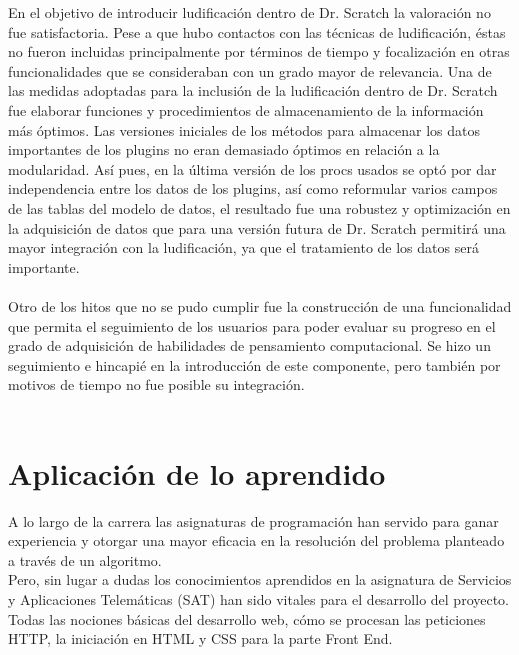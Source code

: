 \documentclass[a4paper, 12pt]{book}
\begin{document}
En el objetivo de introducir ludificación dentro de Dr. Scratch la 
valoración no fue satisfactoria. Pese a que hubo contactos con las 
técnicas de ludificación, éstas no fueron incluidas principalmente 
por términos de tiempo y focalización en otras funcionalidades que 
se consideraban con un grado mayor de relevancia. Una de las medidas
adoptadas para la inclusión de la ludificación dentro de Dr. Scratch
fue elaborar funciones y procedimientos de almacenamiento de la 
información más óptimos. Las versiones iniciales de los métodos para 
almacenar los datos importantes de los plugins no eran demasiado 
óptimos en relación a la modularidad. Así pues, en la última versión
de los procs usados se optó por dar independencia entre los datos de 
los plugins, así como reformular varios campos de las tablas del
modelo de datos, el resultado fue una robustez y optimización en la
adquisición de datos que para una versión futura de Dr. Scratch 
permitirá una mayor integración con la ludificación, ya que el 
tratamiento de los datos será importante. \\ \\

Otro de los hitos que no se pudo cumplir fue la construcción de una
funcionalidad que permita el seguimiento de los usuarios para poder
evaluar su progreso en el grado de adquisición de habilidades de 
pensamiento computacional. Se hizo un seguimiento e hincapié en la 
introducción de este componente, pero también por motivos de tiempo
no fue posible su integración. \\ \\


\section{Aplicación de lo aprendido}
\label{sec:aplicacion}

A lo largo de la carrera las asignaturas de programación han servido para
ganar experiencia y otorgar una mayor eficacia en la resolución del problema
planteado a través de un algoritmo. \\

Pero, sin lugar a dudas los conocimientos aprendidos en la asignatura de Servicios
y Aplicaciones Telemáticas (SAT) han sido vitales para el desarrollo del 
proyecto. Todas las nociones básicas del desarrollo web, cómo se procesan
las peticiones HTTP, la iniciación en HTML y CSS para la parte Front End. \\
\end{document}
